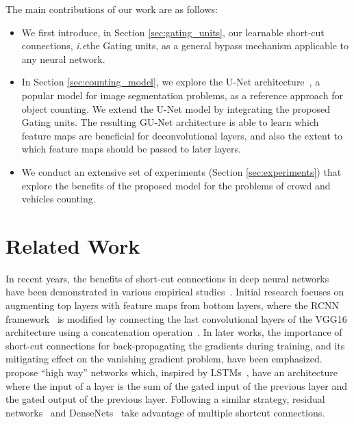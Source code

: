 \documentclass{bmvc2k}
\def\ie{\emph{i.e}\bmvaOneDot}
\begin{document}
The main contributions of our work are as follows:
\begin{itemize}
 \item We first introduce, in Section \ref{sec:gating_units}, our learnable short-cut connections, \ie the Gating units, as a general bypass mechanism applicable to any neural network. 
 \item In Section \ref{sec:counting_model}, we explore the U-Net architecture~\cite{unetRonnebergerFB15}, a popular model for image segmentation problems, as a reference approach for object counting. We extend the U-Net model by integrating the proposed Gating units. The resulting GU-Net architecture is able to learn which feature maps are beneficial for deconvolutional layers, and also the extent to which feature maps should be passed to later layers.
 \item We conduct an extensive set of experiments (Section \ref{sec:experiments}) that explore the benefits of the proposed model for the problems of crowd and vehicles counting.
\end{itemize}

\section{Related Work}

In recent years, the benefits of short-cut connections in deep neural networks have been demonstrated in various empirical studies~\cite{Bell_2016_CVPR, Hariharan_2015_CVPR, Sermanet_2013_ICCV_Workshops, Yang_2015_ICCV, he2016deep, Huang_2017_CVPR}. Initial research focuses on augmenting top layers with feature maps from bottom layers, where the RCNN framework~\cite{girshick2014} is modified by connecting the last convolutional layers of the VGG16 architecture using a concatenation operation~\cite{Bell_2016_CVPR}. In later works, the importance of short-cut connections for back-propagating the gradients during training, and its mitigating effect on the vanishing gradient problem, have been emphasized. \cite{Srivastava_2015_NIPS} propose ``high way'' networks which, inspired by LSTMs~\cite{lstm1999}, have an architecture where the input of a layer is the sum of the gated input of the previous layer and the gated output of the previous layer. Following a similar strategy, residual networks~\cite{he2016deep} and DenseNets~\cite{Huang_2017_CVPR} take advantage of multiple shortcut connections. 
\end{document}
